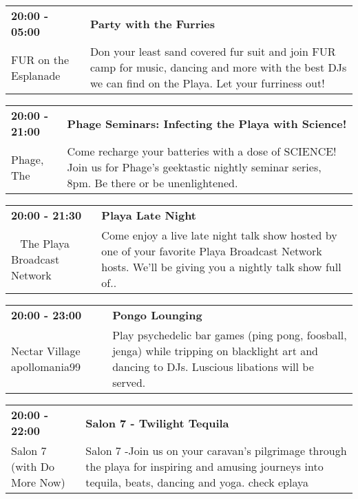 \begin{tabular}{ p{1in} p{2.2in} }
    \textbf{20:00 - 05:00} & \textbf{Party with the Furries} \\
    FUR \newline 6.45 on the Esplanade & Don your least sand covered fur suit and join FUR camp for music, dancing and more with the best DJs we can find on the Playa. Let your furriness out! \\
    \hline 
\end{tabular}
    
\begin{tabular}{ p{1in} p{2.2in} }
    \textbf{20:00 - 21:00} & \textbf{Phage Seminars: Infecting the Playa with Science!} \\
    Phage, The \newline  & Come recharge your batteries with a dose of SCIENCE! Join us for Phage's geektastic nightly seminar series, 8pm. Be there or be unenlightened. \\
    \hline 
\end{tabular}
    
\begin{tabular}{ p{1in} p{2.2in} }
    \textbf{20:00 - 21:30} & \textbf{Playa Late Night} \\
    ~ \newline The Playa Broadcast Network & Come enjoy a live late night talk show hosted by one of your favorite Playa Broadcast Network hosts. We'll be giving you a nightly talk show full of.. \\
    \hline 
\end{tabular}
    
\begin{tabular}{ p{1in} p{2.2in} }
    \textbf{20:00 - 23:00} & \textbf{Pongo Lounging} \\
    Nectar Village \newline apollomania99 & Play psychedelic bar games (ping pong, foosball, jenga) while tripping on blacklight art and dancing to DJs. Luscious libations will be served. \\
    \hline 
\end{tabular}
    
\begin{tabular}{ p{1in} p{2.2in} }
    \textbf{20:00 - 22:00} & \textbf{Salon 7 - Twilight Tequila} \\
    Salon 7  (with Do More Now) \newline  & Salon 7 -Join us on your caravan's pilgrimage through the playa for inspiring and amusing journeys into tequila, beats, dancing and yoga. check eplaya \\
    \hline 
\end{tabular}
    
